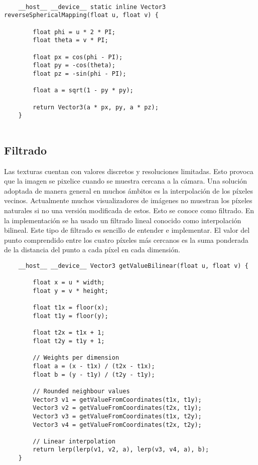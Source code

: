 	\begin{lstlisting}
		
	__host__ __device__ static inline Vector3 reverseSphericalMapping(float u, float v) {

        float phi = u * 2 * PI;
        float theta = v * PI;

        float px = cos(phi - PI);
        float py = -cos(theta);
        float pz = -sin(phi - PI);

        float a = sqrt(1 - py * py);

        return Vector3(a * px, py, a * pz);
    }
	
	\end{lstlisting}
	


\subsection{Filtrado}
			
Las texturas cuentan con valores discretos y resoluciones limitadas. Esto provoca que la imagen se pixelice cuando se muestra cercana a la cámara. Una solución adoptada de manera general en muchos ámbitos es la interpolación de los píxeles vecinos. Actualmente muchos visualizadores de imágenes no muestran los píxeles naturales si no una versión modificada de estos. Esto se conoce como filtrado. En la implementación se ha usado un filtrado lineal conocido como interpolación bilineal. Este tipo de filtrado es sencillo de entender e implementar. El valor del punto  comprendido entre los cuatro píxeles más cercanos es la suma ponderada de la distancia del punto a cada píxel en cada dimensión. 	
	
\begin{lstlisting}
	__host__ __device__ Vector3 getValueBilinear(float u, float v) {
        
        float x = u * width;
        float y = v * height;

        float t1x = floor(x);
        float t1y = floor(y);

        float t2x = t1x + 1;
        float t2y = t1y + 1;

		// Weights per dimension
        float a = (x - t1x) / (t2x - t1x);
        float b = (y - t1y) / (t2y - t1y);

		// Rounded neighbour values
        Vector3 v1 = getValueFromCoordinates(t1x, t1y);
        Vector3 v2 = getValueFromCoordinates(t2x, t1y);
        Vector3 v3 = getValueFromCoordinates(t1x, t2y);
        Vector3 v4 = getValueFromCoordinates(t2x, t2y);

		// Linear interpolation
        return lerp(lerp(v1, v2, a), lerp(v3, v4, a), b);
	}
\end{lstlisting}
	

